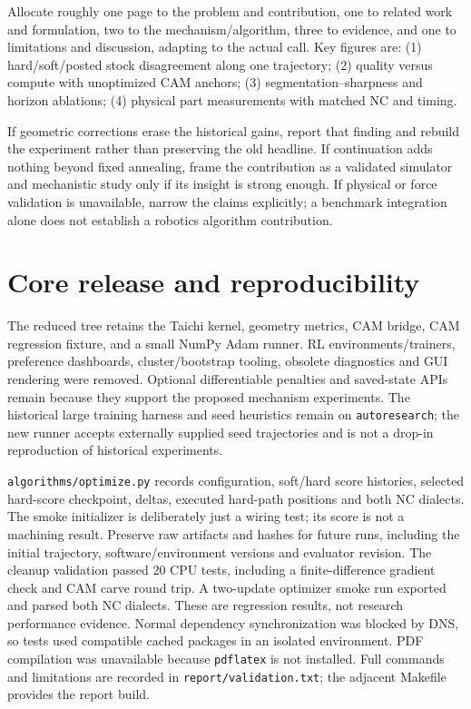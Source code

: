 \documentclass[11pt]{article}
\begin{document}
Allocate roughly one page to the problem and contribution, one to related work
and formulation, two to the mechanism/algorithm, three to evidence, and one to
limitations and discussion, adapting to the actual call. Key figures are:
(1) hard/soft/posted stock disagreement along one trajectory; (2) quality versus
compute with unoptimized CAM anchors; (3) segmentation--sharpness and horizon
ablations; (4) physical part measurements with matched NC and timing.

If geometric corrections erase the historical gains, report that finding and
rebuild the experiment rather than preserving the old headline. If continuation
adds nothing beyond fixed annealing, frame the contribution as a validated
simulator and mechanistic study only if its insight is strong enough. If physical
or force validation is unavailable, narrow the claims explicitly; a benchmark
integration alone does not establish a robotics algorithm contribution.

\section{Core release and reproducibility}
The reduced tree retains the Taichi kernel, geometry metrics, CAM bridge,
CAM regression fixture, and a small NumPy Adam runner. RL environments/trainers,
preference dashboards, cluster/bootstrap tooling, obsolete diagnostics and GUI
rendering were removed. Optional differentiable penalties and saved-state APIs
remain because they support the proposed mechanism experiments. The historical
large training harness and seed heuristics remain on \texttt{autoresearch}; the
new runner accepts externally supplied seed trajectories and is not a drop-in
reproduction of historical experiments.

\texttt{algorithms/optimize.py} records configuration, soft/hard score histories,
selected hard-score checkpoint, deltas, executed hard-path positions and both
NC dialects. The smoke initializer is deliberately just a wiring test; its score
is not a machining result. Preserve raw artifacts and hashes for future runs,
including the initial trajectory, software/environment versions and evaluator
revision. The cleanup validation passed 20 CPU tests, including a finite-difference
gradient check and CAM carve round trip. A two-update optimizer smoke run
exported and parsed both NC dialects. These are regression results, not research
performance evidence. Normal dependency synchronization was blocked by DNS, so
tests used compatible cached packages in an isolated environment. PDF compilation
was unavailable because \texttt{pdflatex} is not installed. Full commands and
limitations are recorded in \texttt{report/validation.txt}; the adjacent Makefile
provides the report build.
\end{document}
